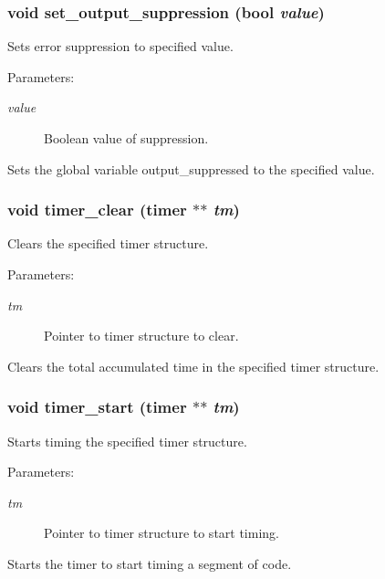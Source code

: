 \subsubsection{\setlength{\rightskip}{0pt plus 5cm}void set\_\-output\_\-suppression ({\bf bool} {\em value})}\label{util_8h_a0}


Sets error suppression to specified value. 

\begin{Desc}
\item[Parameters:]
\begin{description}
\item[{\em value}]Boolean value of suppression.\end{description}
\end{Desc}
Sets the global variable output\_\-suppressed to the specified value. 
\subsubsection{\setlength{\rightskip}{0pt plus 5cm}void timer\_\-clear ({\bf timer} $\ast$$\ast$ {\em tm})}\label{util_8h_a18}


Clears the specified timer structure. 

\begin{Desc}
\item[Parameters:]
\begin{description}
\item[{\em tm}]Pointer to timer structure to clear.\end{description}
\end{Desc}
Clears the total accumulated time in the specified timer structure. 
\subsubsection{\setlength{\rightskip}{0pt plus 5cm}void timer\_\-start ({\bf timer} $\ast$$\ast$ {\em tm})}\label{util_8h_a19}


Starts timing the specified timer structure. 

\begin{Desc}
\item[Parameters:]
\begin{description}
\item[{\em tm}]Pointer to timer structure to start timing.\end{description}
\end{Desc}
Starts the timer to start timing a segment of code. 
